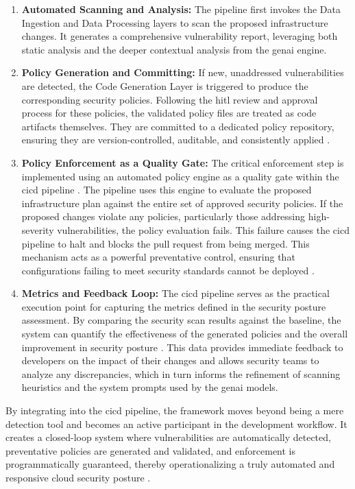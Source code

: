 \begin{enumerate}
\item \textbf{Automated Scanning and Analysis:} The pipeline first invokes the Data Ingestion and Data Processing layers to scan the proposed infrastructure changes. It generates a comprehensive vulnerability report, leveraging both static analysis and the deeper contextual analysis from the \gls{genai} engine.
\item \textbf{Policy Generation and Committing:} If new, unaddressed vulnerabilities are detected, the Code Generation Layer is triggered to produce the corresponding security policies. Following the \gls{hitl} review and approval process for these policies, the validated policy files are treated as code artifacts themselves. They are committed to a dedicated policy repository, ensuring they are version-controlled, auditable, and consistently applied \cite{sarathe_krisshnan_jutoo_vijayaraghavan_policy_2025}.
\item \textbf{Policy Enforcement as a Quality Gate:} The critical enforcement step is implemented using an automated policy engine as a quality gate within the \gls{cicd} pipeline \cite{noauthor_streamlining_nodate}. The pipeline uses this engine to evaluate the proposed infrastructure plan against the entire set of approved security policies. If the proposed changes violate any policies, particularly those addressing high-severity vulnerabilities, the policy evaluation fails. This failure causes the \gls{cicd} pipeline to halt and blocks the pull request from being merged. This mechanism acts as a powerful preventative control, ensuring that configurations failing to meet security standards cannot be deployed \cite{sarathe_krisshnan_jutoo_vijayaraghavan_policy_2025} \cite{noauthor_streamlining_nodate}.
\item \textbf{Metrics and Feedback Loop:} The \gls{cicd} pipeline serves as the practical execution point for capturing the metrics defined in the security posture assessment. By comparing the security scan results against the baseline, the system can quantify the effectiveness of the generated policies and the overall improvement in security posture  . This data provides immediate feedback to developers on the impact of their changes and allows security teams to analyze any discrepancies, which in turn informs the refinement of scanning heuristics and the system prompts used by the \gls{genai} models.
\end{enumerate}

By integrating into the \gls{cicd} pipeline, the framework moves beyond being a mere detection tool and becomes an active participant in the development workflow. It creates a closed-loop system where vulnerabilities are automatically detected, preventative policies are generated and validated, and enforcement is programmatically guaranteed, thereby operationalizing a truly automated and responsive cloud security posture  \cite{noauthor_streamlining_nodate}.

